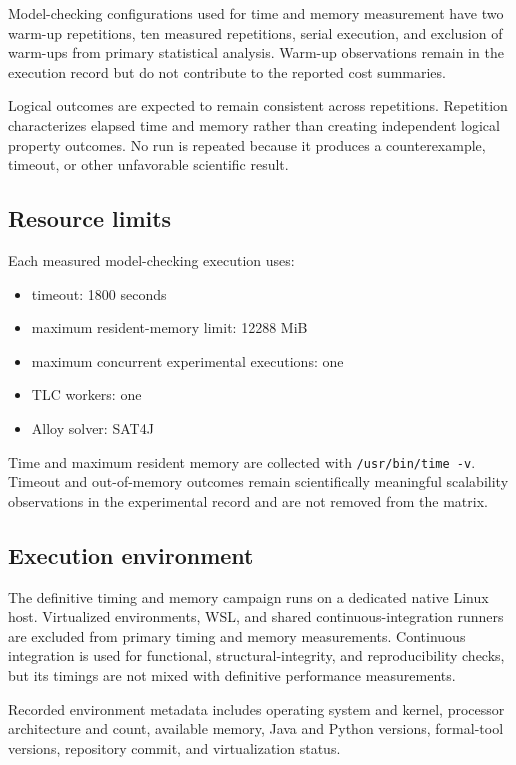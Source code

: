 Model-checking configurations used for time and memory measurement have two
warm-up repetitions, ten measured repetitions, serial execution, and exclusion
of warm-ups from primary statistical analysis. Warm-up observations remain in
the execution record but do not contribute to the reported cost summaries.

Logical outcomes are expected to remain consistent across repetitions.
Repetition characterizes elapsed time and memory rather than creating
independent logical property outcomes. No run is repeated because it produces a
counterexample, timeout, or other unfavorable scientific result.

\subsection{Resource limits}
\label{subsec:resource-limits}

Each measured model-checking execution uses:

\begin{itemize}
\item timeout: 1800 seconds
\item maximum resident-memory limit: 12288 MiB
\item maximum concurrent experimental executions: one
\item TLC workers: one
\item Alloy solver: SAT4J
\end{itemize}

Time and maximum resident memory are collected with
\texttt{/usr/bin/time -v}. Timeout and out-of-memory outcomes remain
scientifically meaningful scalability observations in the experimental record
and are not removed from the matrix.

\subsection{Execution environment}
\label{subsec:execution-environment}

The definitive timing and memory campaign runs on a dedicated native Linux host.
Virtualized environments, WSL, and shared continuous-integration runners are
excluded from primary timing and memory measurements. Continuous integration is
used for functional, structural-integrity, and reproducibility checks, but its
timings are not mixed with definitive performance measurements.

Recorded environment metadata includes operating system and kernel, processor
architecture and count, available memory, Java and Python versions, formal-tool
versions, repository commit, and virtualization status.

